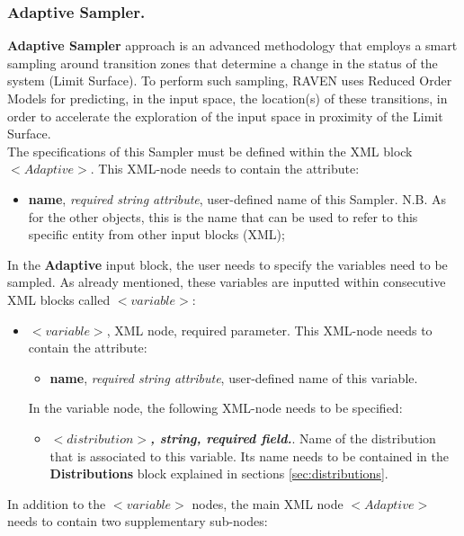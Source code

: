 \subsubsection{Adaptive Sampler.}
\label{subsubsubsec:AdaptiveSampling}
\textbf{Adaptive Sampler} approach is an advanced methodology that employs a smart sampling around transition zones that determine a change in the status of the system (Limit Surface). To perform such sampling, RAVEN uses Reduced Order Models for predicting, in the input space, the location(s) of these transitions, in order to accelerate the exploration of the input space in proximity of the Limit Surface.
\\ The specifications of this Sampler must be defined within the XML block $<Adaptive>$. This XML-node needs to contain the attribute:
\begin{itemize}
\itemsep0em
\item \textbf{name}, \textit{required string attribute}, user-defined name of this Sampler. N.B. As for the other objects, this is the name that can be used to refer to this specific entity from other input blocks (XML);
\end{itemize}
In the \textbf{Adaptive} input block, the user needs to specify the variables need to be sampled. As already mentioned, these variables are inputted within consecutive XML blocks called $<variable>$:
\begin{itemize}
\item $<variable>$, XML node, required parameter. This XML-node needs to contain the attribute:
\begin{itemize}
  \item \textbf{name}, \textit{required string attribute}, user-defined name of this variable.
 \end{itemize}
 In the variable node, the following XML-node needs to be specified:
 \begin{itemize}
    \item $<distribution>$\textbf{\textit{, string, required field.}}. Name of the distribution that is associated to this variable. Its name needs to be contained in the \textbf{Distributions} block explained in sections \ref{sec:distributions}.
  \end{itemize}
\end{itemize}
 In addition to the $<variable>$ nodes,  the main XML node $<Adaptive>$ needs to contain two supplementary sub-nodes:
